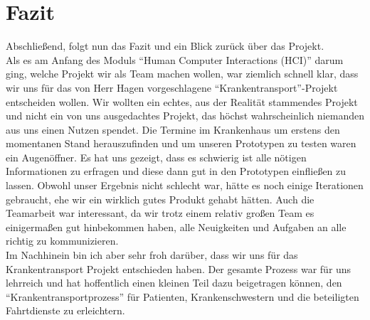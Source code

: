 \documentclass[a4paper, ngerman, 12pt]{scrartcl}
\begin{document}
\section{Fazit}
Abschließend, folgt nun das Fazit und ein Blick zurück über das Projekt.\\
Als es am Anfang des Moduls ``Human Computer Interactions (HCI)'' darum ging, welche Projekt wir als Team machen wollen, war ziemlich schnell klar, dass wir uns für das von Herr Hagen vorgeschlagene ``Krankentransport''-Projekt entscheiden wollen. Wir wollten ein echtes, aus der Realität stammendes Projekt und nicht ein von uns ausgedachtes Projekt, das höchst wahrscheinlich niemanden aus uns einen Nutzen spendet. Die Termine im Krankenhaus um erstens den momentanen Stand herauszufinden und um unseren Prototypen zu testen waren ein Augenöffner. Es hat uns gezeigt, dass es schwierig ist alle nötigen Informationen zu erfragen und diese dann gut in den Prototypen einfließen zu lassen. Obwohl unser Ergebnis nicht schlecht war, hätte es noch einige Iterationen gebraucht, ehe wir ein wirklich gutes Produkt gehabt hätten. Auch die Teamarbeit war interessant, da wir trotz einem relativ großen Team es einigermaßen gut hinbekommen haben, alle Neuigkeiten und Aufgaben an alle richtig zu kommunizieren.\\
Im Nachhinein bin ich aber sehr froh darüber, dass wir uns für das Krankentransport Projekt entschieden haben. Der gesamte Prozess war für uns lehrreich und hat hoffentlich einen kleinen Teil dazu beigetragen können, den ``Krankentransportprozess'' für Patienten, Krankenschwestern und die beteiligten Fahrtdienste zu erleichtern.\\
\end{document}
